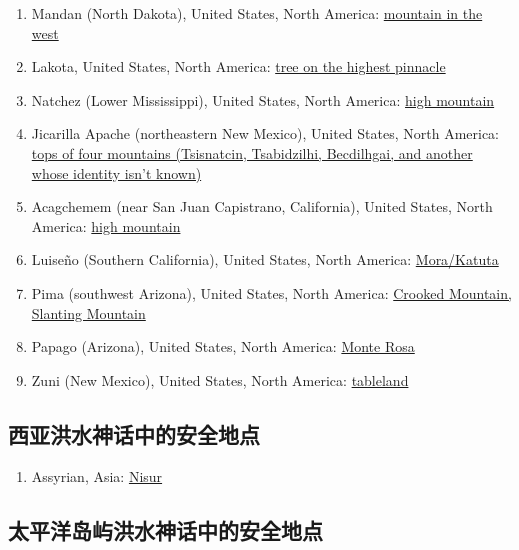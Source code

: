 \documentclass[10pt,twocolumn,letterpaper]{article}
\begin{document}
\begin{flushleft}
\begin{enumerate}
\item Mandan (North Dakota), United States, North America: \href{http://www.talkorigins.org/faqs/flood-myths.html#Mandan}{mountain in the west}
\item Lakota, United States, North America: \href{http://www.talkorigins.org/faqs/flood-myths.html#Lakota}{tree on the highest pinnacle}
\item Natchez (Lower Mississippi), United States, North America: \href{http://www.talkorigins.org/faqs/flood-myths.html#Natchez}{high mountain}
\item Jicarilla Apache (northeastern New Mexico), United States, North America: \href{http://www.talkorigins.org/faqs/flood-myths.html#Jicarilla}{tops of four mountains (Tsisnatcin, Tsabidzilhi, Becdilhgai, and another whose identity isn't known)}
\item Acagchemem (near San Juan Capistrano, California), United States, North America: \href{http://www.talkorigins.org/faqs/flood-myths.html#Acagchemem}{high mountain}
\item Luiseño (Southern California), United States, North America: \href{http://www.talkorigins.org/faqs/flood-myths.html#Luiseno}{Mora/Katuta}
\item Pima (southwest Arizona), United States, North America: \href{http://www.talkorigins.org/faqs/flood-myths.html#Pima}{Crooked Mountain, Slanting Mountain}
\item Papago (Arizona), United States, North America: \href{http://www.talkorigins.org/faqs/flood-myths.html#Papago}{Monte Rosa}
\item Zuni (New Mexico), United States, North America: \href{http://www.talkorigins.org/faqs/flood-myths.html#Zuni}{tableland}
\end{enumerate}
\end{flushleft}

\subsection{西亚洪水神话中的安全地点}

\begin{flushleft}
\begin{enumerate}
\item Assyrian, Asia: \href{http://www.talkorigins.org/faqs/flood-myths.html#Assyrian}{Nisur}
\end{enumerate}
\end{flushleft}

\subsection{太平洋岛屿洪水神话中的安全地点}
\end{document}
